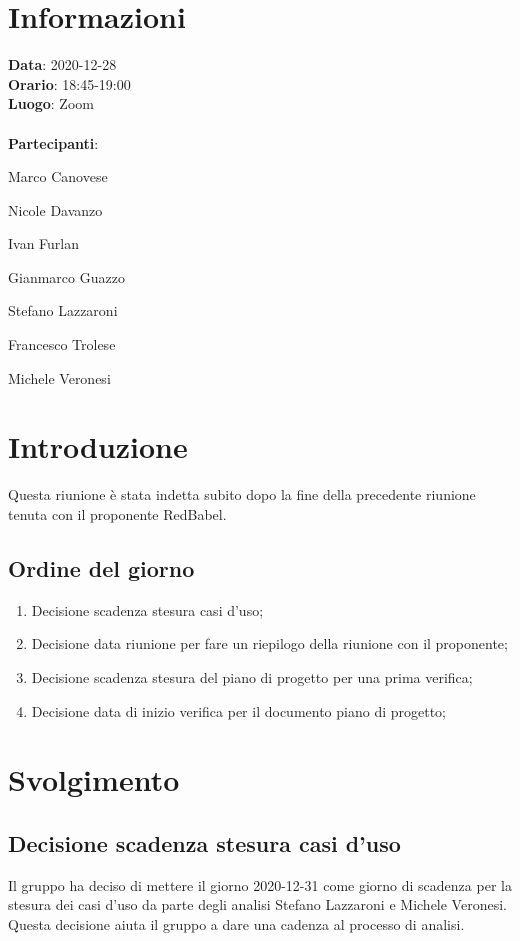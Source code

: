 \section{Informazioni}
\textbf{Data}: 2020-12-28\\
\textbf{Orario}: 18:45-19:00\\
\textbf{Luogo}: Zoom\\\\
\textbf{Partecipanti}:\begin{list}{*}{\setlength{\itemsep}{0cm}}
	\item Marco Canovese
	\item Nicole Davanzo
	\item Ivan Furlan
	\item Gianmarco Guazzo
	\item Stefano Lazzaroni
	\item Francesco Trolese
	\item Michele Veronesi
\end{list}

\section{Introduzione}
Questa riunione è stata indetta subito dopo la fine della precedente riunione tenuta con il proponente RedBabel.

\subsection{Ordine del giorno}
\begin{enumerate}
    \item Decisione scadenza stesura casi d'uso;
    \item Decisione data riunione per fare un riepilogo della riunione con il proponente;
    \item Decisione scadenza stesura del piano di progetto per una prima verifica;
    \item Decisione data di inizio verifica per il documento piano di progetto;
\end{enumerate}

\section{Svolgimento}
\subsection{Decisione scadenza stesura casi d'uso} 
Il gruppo ha deciso di mettere il giorno 2020-12-31 come giorno di scadenza per la stesura dei casi d'uso da parte degli analisi Stefano Lazzaroni e Michele Veronesi. Questa decisione aiuta il gruppo a dare una cadenza al processo di analisi. 

